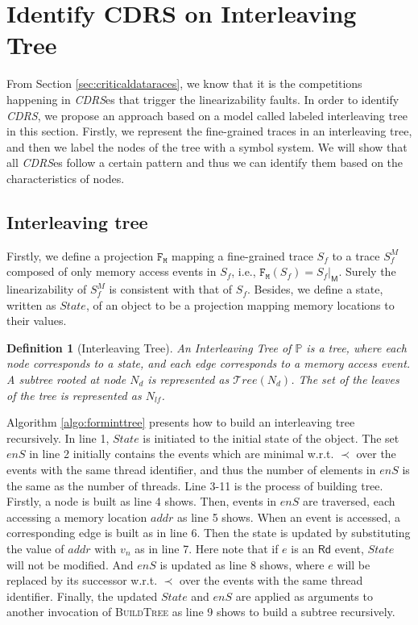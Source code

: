 \documentclass[runningheads]{llncs}
\newcommand{\eread}{\mathsf{Rd}}
\newtheorem{myDef}{Definition}
\begin{document}
\section{Identify CDRS on Interleaving Tree}\label{sec:intertree}
From Section \ref{sec:criticaldataraces}, we know that it is the competitions happening in \textit{CDRS}es that trigger the linearizability faults. In order to identify \textit{CDRS}, we propose an approach based on a model called labeled interleaving tree in this section. Firstly, we represent the fine-grained traces in an interleaving tree, and then we label the nodes of the tree with a symbol system. We will show that all \textit{CDRS}es follow a certain pattern and thus we can identify them based on the characteristics of nodes. 
\subsection{Interleaving tree}

Firstly, we define a projection $\mathtt{F_M}$ mapping a fine-grained trace $S_f$ to a trace $S^M_f$ composed of only memory access events in $S_f$, i.e., $\mathtt{F_M}(S_f) = S_f|_{\mathsf{M}}$. Surely the linearizability of $S^M_f$ is consistent with that of $S_f$.  Besides, we define a state, written as $\mathit{State}$, of an object to be a projection mapping memory locations to their values.

\begin{myDef}[Interleaving Tree]
    An \textit{Interleaving Tree} of $\mathbb{P}$ is a tree, where each node corresponds to a state, and each edge corresponds to a memory access event. A subtree rooted at node $N_d$ is represented as $\mathcal{T}ree(N_d)$. The set of the leaves of the tree is represented as $N_{lf}$.
\end{myDef}

    Algorithm \ref{algo:forminttree} presents how to build an interleaving tree recursively. In line 1, $State$ is initiated to the initial state of the object. The set $\mathit{enS}$ in line 2 initially contains the events which are minimal w.r.t. $\prec$ over the events with the same thread identifier, and thus the number of elements in $\mathit{enS}$ is the same as the number of threads. Line 3-11 is the process of building tree. Firstly, a node is built as line 4 shows. Then, events in $\mathit{enS}$ are traversed, each accessing a memory location $addr$ as line 5 shows. When an event is accessed, a corresponding edge is built as in line 6. Then the state is updated by substituting the value of $addr$ with $v_n$ as in line 7. Here note that if $e$ is an $\eread$ event, $State$ will not be modified. And $\mathit{enS}$ is updated as line 8 shows, where $e$ will be replaced by its successor w.r.t. $\prec$ over the events with the same thread identifier. Finally, the updated $\mathit{State}$ and $\mathit{enS}$ are applied as arguments to another invocation of \textsc{BuildTree} as line 9 shows to build a subtree recursively.
\end{document}
